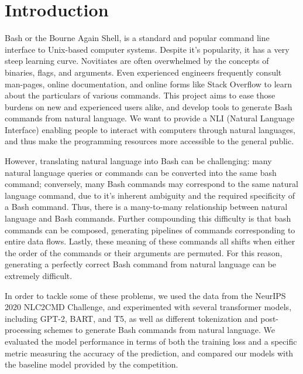 \section{Introduction}
Bash or the Bourne Again Shell, is a standard and popular command line
interface to Unix-based computer systems. Despite it's popularity, it has a
very steep learning curve. Novitiates are often overwhelmed by the concepts of
binaries, flags, and arguments. Even experienced engineers frequently consult
man-pages, online documentation, and online forms like Stack Overflow to learn
about the particulars of various commands. This project aims to ease those
burdens on new and experienced users alike, and develop tools to generate Bash
commands from natural language. We want to provide a NLI (Natural Language
Interface) enabling people to interact with computers through natural
languages, and thus make the programming resources more accessible to the
general public.
\par
However, translating natural language into Bash can be challenging: many
natural language queries or commands can be converted into the same bash
command; conversely, many Bash commands may correspond to the same natural
language command, due to it's inherent ambiguity and the required specificity
of a Bash command. Thus, there is a many-to-many relationship between natural
language and Bash commands. Further compounding this difficulty is that bash
commands can be composed, generating pipelines of commands corresponding to
entire data flows. Lastly, these meaning of these commands all shifts when
either the order of the commands or their arguments are permuted. For this
reason, generating a perfectly correct Bash command from natural language can
be extremely difficult.
\par
In order to tackle some of these problems, we used the data from the NeurIPS
2020 NLC2CMD Challenge, and experimented with several transformer models,
including GPT-2, BART, and T5, as well as different tokenization and
post-processing schemes to generate Bash commands from natural language. We
evaluated the model performance in terms of both the training loss and a
specific metric measuring the accuracy of the prediction, and compared our
models with the baseline model provided by the competition.

